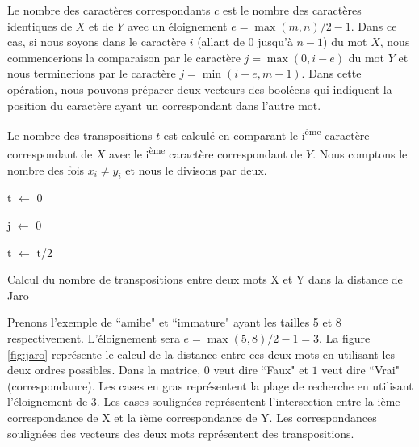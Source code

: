\documentclass{KodeBook}
\begin{document}
Le nombre des caractères correspondants $c$  est le nombre des caractères identiques de $X$ et de $Y$ avec un éloignement $ e= \max (m, n)/2 - 1$. Dans ce cas, si nous soyons dans le caractère $i$ (allant de $0$ jusqu'à $n-1$) du mot $X$, nous commencerions la comparaison par le caractère $j=\max(0, i - e)$ du mot $Y$ et nous terminerions par le caractère $j=\min(i+e, m-1)$.
Dans cette opération, nous pouvons préparer deux vecteurs des booléens qui indiquent la position du caractère ayant un correspondant dans l'autre mot.

Le nombre des transpositions $t$ est calculé en comparant le i\textsuperscript{ème} caractère correspondant de $X$ avec le i\textsuperscript{ème} caractère correspondant de $Y$. 
Nous comptons le nombre des fois $x_i \ne y_i$  et nous le divisons par deux.
\begin{algorithm}[H]
	t $\leftarrow$ 0\;
	
	j $\leftarrow$ 0\;
	
    
    t $\leftarrow$ t/2\;
    
    \caption{Calcul du nombre de transpositions entre deux mots X et Y dans la distance de Jaro \label{algo:jaro-transpo}}
	
\end{algorithm}

Prenons l'exemple de ``amibe"  et ``immature" ayant les tailles 5 et 8 respectivement.
L'éloignement sera $e=\max(5, 8)/2 - 1 = 3$.
La figure \ref{fig:jaro} représente le calcul de la distance entre ces deux mots en utilisant les deux ordres possibles.
Dans la matrice, $0$ veut dire ``Faux" et $1$  veut dire ``Vrai" (correspondance). 
Les cases en gras représentent la plage de recherche en utilisant l'éloignement de 3. 
Les cases soulignées représentent l'intersection entre la ième correspondance de X et la ième correspondance de Y.
Les correspondances soulignées des vecteurs des deux mots représentent des transpositions. 
\end{document}
